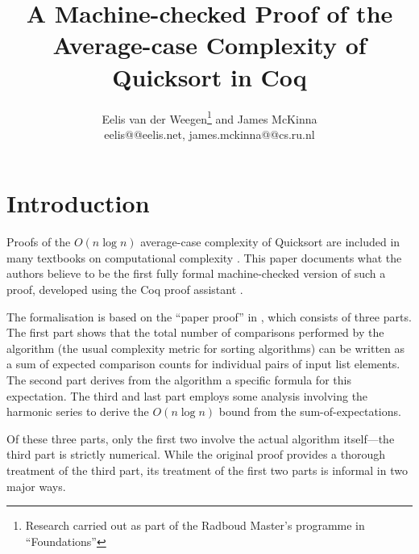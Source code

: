\documentclass[runningheads]{llncs}
\newcommand{\eelis}{Eelis van der Weegen}
\newcommand{\james}{James McKinna}
\newcommand{\thetitle}{A Machine-checked Proof of the Average-case Complexity of Quicksort in Coq}
\begin{document}
\nocite{*}

\title{\thetitle}

\authorrunning{\em}
\titlerunning{\em}

\author{\eelis\thanks{Research carried out as part of the Radboud Master's programme in ``Foundations''} and \james \\
eelis@@eelis.net, james.mckinna@@cs.ru.nl}


\maketitle

\begin{abstract}
  
\end{abstract}

\section{Introduction}
\label{intro}

Proofs of the $O(n \log n)$ average-case complexity of Quicksort \cite{HoareQuick} are included in many textbooks on computational complexity \cite[for example]{introtoalgos}.
This paper documents what the authors believe to be the first fully formal machine-checked version of such a proof, developed using the Coq proof assistant \cite{coq}.

The formalisation is based on the ``paper proof'' in \cite{introtoalgos}, which consists of three parts. The first part shows that the total number of comparisons performed by the algorithm (the usual complexity metric for sorting algorithms) can be written as a sum of expected comparison counts for individual pairs of input list elements. The second part derives from the algorithm a specific formula for this expectation. The third and last part employs some analysis involving the harmonic series to derive the $O(n \log n)$ bound from the sum-of-expectations.

Of these three parts, only the first two involve the actual algorithm itself---the third part is strictly numerical. While the original proof provides a thorough treatment of the third part, its treatment of the first two parts is informal in two major ways.
\end{document}
